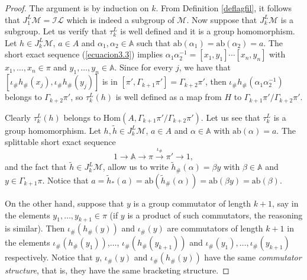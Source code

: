 \documentclass[10pt]{amsart}
\numberwithin{equation}{section}
\numberwithin{equation}{section}
\theoremstyle{definition}
\begin{document}
\begin{proof}  The argument is by induction on $k$. From Definition \ref{deflagfil}, it follows that $J_1^L\mathcal{M}=\mathcal{IL}$ which is indeed a subgroup of $\mathcal{M}$. Now suppose that $J_k^L\mathcal{M}$ is a subgroup. Let us verify that $\tau_k^L$ is well defined and it is a group homomorphism. Let $h\in J_k^L\mathcal{M}$, $a\in A$ and $\alpha_1,\alpha_2\in \mathbb{A}$ such that $\text{ab}(\alpha_1)=\text{ab}(\alpha_2)=a$. The short exact sequence (\ref{ecuacion3.3}) implies $\alpha_1\alpha_2^{-1}=[x_1,y_1]\cdots[x_n,y_n]$ with $x_1,\ldots,x_n\in\pi$ and $y_1,\ldots,y_n\in\mathbb{A}$. Since for every $j$, we have that $[\iota_{\#}h_{\#}(x_j),\iota_{\#}h_{\#}(y_j)]$ is in $[\pi',\Gamma_{k+1}\pi']=\Gamma_{k+2}\pi'$, then $\iota_{\#}h_{\#}(\alpha_1\alpha_2^{-1})$ belongs to $\Gamma_{k+2}\pi'$, so $\tau_k^L(h)$ is well defined as a map from $H$ to $\Gamma_{k+1}\pi'/\Gamma_{k+2}\pi'$. 

Clearly $\tau_k^L(h)$ belongs to $\text{Hom}(A,\Gamma_{k+1}\pi'/\Gamma_{k+2}\pi')$. Let us see that $\tau_k^L$ is a group homomorphism. Let $h,\widetilde{h}\in J_k^L\mathcal{M}$, $a\in A$ and $\alpha\in\mathbb{A}$ with $\text{ab}(\alpha)=a$.
The splittable short exact sequence 
\begin{equation}\label{ecuacion3.10}%
1\longrightarrow \mathbb{A}\longrightarrow \pi\stackrel{\iota_{\#}}{\longrightarrow}\pi'\longrightarrow 1,
\end{equation}
\noindent and the fact that $\widetilde{h}\in J_k^L\mathcal{M}$, allow us to write $\widetilde{h}_{\#}(\alpha)=\beta y$ with  $\beta\in\mathbb{A}$ and $y\in\Gamma_{k+1}\pi$.  Notice that $a=\widetilde{h}_{*}(a)=\text{ab}(\widetilde{h}_{\#}(\alpha))=\text{ab}(\beta y)=\text{ab}(\beta)$.

On the other hand,  suppose  that $y$ is  a group commutator of length $k+1$, say in the elements $y_1,\ldots, y_{k+1}\in\pi$ (if $y$ is a product of such commutators, the reasoning is similar). Then $\iota_{\#}(h_{\#}(y))$ and $\iota_{\#}(y)$ are commutators of length $k+1$ in the elements  $\iota_{\#}(h_{\#}(y_1))$,$\ldots$, $\iota_{\#}(h_{\#}(y_{k+1}))$ and $\iota_{\#}(y_1),\ldots, \iota_{\#}(y_{k+1})$ respectively. Notice that $y$, $\iota_{\#}(y)$ and $\iota_{\#}(h_{\#}(y))$ have the same  \emph{commutator structure}, that is, they have the same bracketing structure.


\end{proof}
\end{document}
